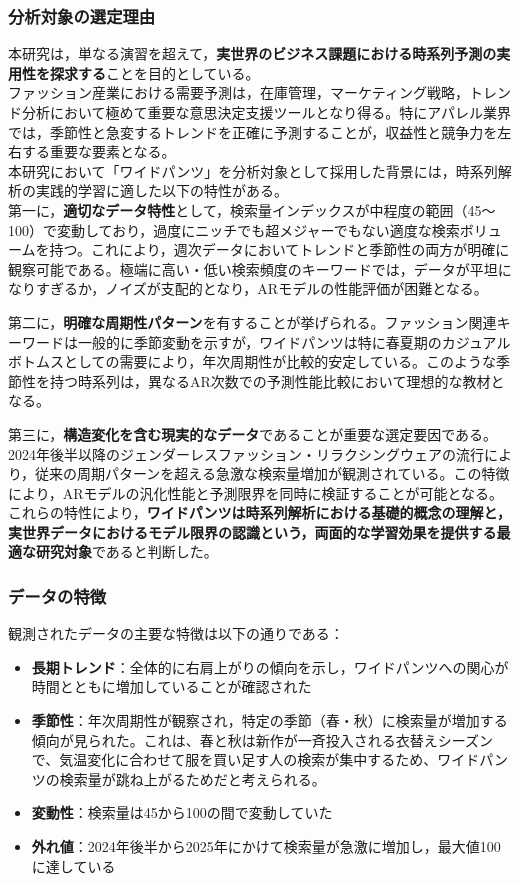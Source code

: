 \documentclass[12pt]{article}
\begin{document}
\subsubsection{分析対象の選定理由}
本研究は，単なる演習を超えて，\textbf{実世界のビジネス課題における時系列予測の実用性を探求する}ことを目的としている。\\

ファッション産業における需要予測は，在庫管理，マーケティング戦略，トレンド分析において極めて重要な意思決定支援ツールとなり得る。特にアパレル業界では，季節性と急変するトレンドを正確に予測することが，収益性と競争力を左右する重要な要素となる。\\

本研究において「ワイドパンツ」を分析対象として採用した背景には，時系列解析の実践的学習に適した以下の特性がある。\\

第一に，\textbf{適切なデータ特性}として，検索量インデックスが中程度の範囲（45～100）で変動しており，過度にニッチでも超メジャーでもない適度な検索ボリュームを持つ。これにより，週次データにおいてトレンドと季節性の両方が明確に観察可能である。極端に高い・低い検索頻度のキーワードでは，データが平坦になりすぎるか，ノイズが支配的となり，ARモデルの性能評価が困難となる。

第二に，\textbf{明確な周期性パターン}を有することが挙げられる。ファッション関連キーワードは一般的に季節変動を示すが，ワイドパンツは特に春夏期のカジュアルボトムスとしての需要により，年次周期性が比較的安定している。このような季節性を持つ時系列は，異なるAR次数での予測性能比較において理想的な教材となる。

第三に，\textbf{構造変化を含む現実的なデータ}であることが重要な選定要因である。2024年後半以降のジェンダーレスファッション・リラクシングウェアの流行により，従来の周期パターンを超える急激な検索量増加が観測されている。この特徴により，ARモデルの汎化性能と予測限界を同時に検証することが可能となる。
\\

これらの特性により，\textbf{ワイドパンツは時系列解析における基礎的概念の理解と，実世界データにおけるモデル限界の認識という，両面的な学習効果を提供する最適な研究対象}であると判断した。

\subsubsection{データの特徴}
観測されたデータの主要な特徴は以下の通りである：

\begin{itemize}
\item \textbf{長期トレンド}：全体的に右肩上がりの傾向を示し，ワイドパンツへの関心が時間とともに増加していることが確認された
\item \textbf{季節性}：年次周期性が観察され，特定の季節（春・秋）に検索量が増加する傾向が見られた。これは、春と秋は新作が一斉投入される衣替えシーズンで、気温変化に合わせて服を買い足す人の検索が集中するため、ワイドパンツの検索量が跳ね上がるためだと考えられる。
\item \textbf{変動性}：検索量は45から100の間で変動していた
\item \textbf{外れ値}：2024年後半から2025年にかけて検索量が急激に増加し，最大値100に達している
\end{itemize}
\end{document}
